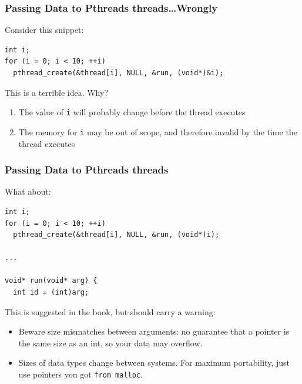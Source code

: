 \begin{frame}[fragile]
  \frametitle{Passing Data to Pthreads threads\ldots Wrongly}


Consider this snippet:
\vfill
\begin{lstlisting}
int i;
for (i = 0; i < 10; ++i)
  pthread_create(&thread[i], NULL, &run, (void*)&i);
\end{lstlisting}
  \vfill
  This is a \alert{terrible} idea. Why?
  \vfill
  \begin{enumerate}
    \item<2-> The value of {\tt i} will probably change before the thread executes
    \item<2-> The memory for {\tt i} may be out of scope, and therefore invalid by
          the time the thread executes
  \end{enumerate}


\end{frame}

\begin{frame}[fragile]
  \frametitle{Passing Data to Pthreads threads}


What about:
\begin{lstlisting}
int i;
for (i = 0; i < 10; ++i)
  pthread_create(&thread[i], NULL, &run, (void*)i);

...

void* run(void* arg) {
  int id = (int)arg;
\end{lstlisting}
  \vfill
  This is suggested in the book, but should carry a warning:

  \vfill
  \begin{itemize}
    \item<2-> Beware size mismatches between arguments: 
      no guarantee that a pointer is the same size as an int, so your data
      may overflow.
    \item<2-> Sizes of data types change between systems. For maximum
      portability, just use pointers you got {\tt from malloc}.
  \end{itemize}


\end{frame}

